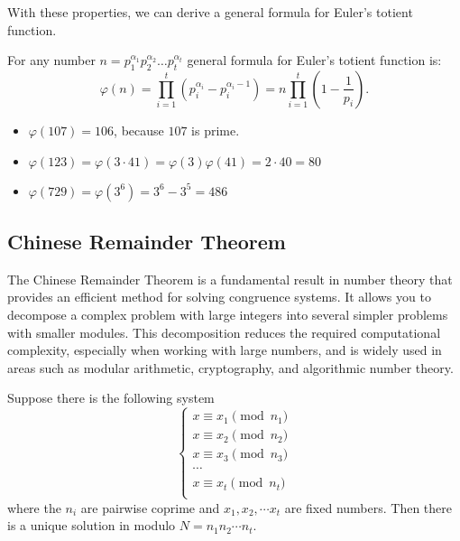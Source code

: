 \documentclass[../lecture-notes-148x210.tex]{subfiles}
\begin{document}
With these properties, we can derive a general formula for Euler's totient function. 

\begin{corollary}
    For any number $n = p_{1}^{\alpha_1}p_{2}^{\alpha_2} \dots p_{t}^{\alpha_t}$ general formula for Euler's totient function is: 
    \begin{equation*}
        \varphi(n) = \prod_{i = 1}^{t} \left( p_{i}^{\alpha_i} - p_{i}^{\alpha_i - 1} \right) = n \prod_{i = 1}^{t} \left( 1 - \frac{1}{p_i} \right).
    \end{equation*}
\end{corollary}

\begin{example}
    \hfill

    \begin{itemize}
        \item $\varphi(107) = 106$, because $107$ is prime.
        \item $\varphi(123) = \varphi(3 \cdot 41) = \varphi(3)\varphi(41) = 2 \cdot 40 = 80$
        \item $\varphi(729) = \varphi(3^6) = 3^6 - 3^5 = 486$
    \end{itemize}
\end{example}

\subsection{Chinese Remainder Theorem}
The Chinese Remainder Theorem is a fundamental result in number theory
that provides an efficient method for solving congruence systems. It allows you to
decompose a complex problem with large integers into several simpler 
problems with smaller modules. This decomposition reduces the required computational 
complexity, especially when working with large numbers, and is widely used 
in areas such as modular arithmetic, cryptography, and algorithmic number theory. 

\begin{theorem}  \label{th:chinese_remainder_theorem}
    Suppose there is the following system
    \begin{equation*}    
        \begin{cases}
            x \equiv x_1 \pmod{n_1} \\
            x \equiv x_2 \pmod{n_2} \\
            x \equiv x_3 \pmod{n_3} \\
            \cdots \\
            x \equiv x_t \pmod{n_t} \\
        \end{cases}
    \end{equation*}
    where the $n_i$ are pairwise coprime and $x_1, x_2, \cdots x_t$ are fixed numbers. 
    Then there is a unique solution in modulo $N = n_1n_2 \cdots n_t$.
\end{theorem}
\end{document}

